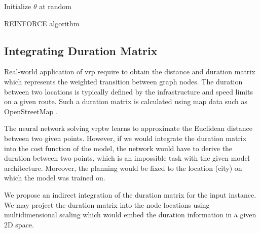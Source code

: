         \begin{algorithm}[H]
            
            Initialize $\theta$ at random\;
         \caption{REINFORCE algorithm}
        \end{algorithm}
        
    
    \subsection{Integrating Duration Matrix}
    Real-world application of \gls{vrp} require to obtain the distance and duration matrix which represents the weighted transition between graph nodes. The duration between two locations is typically defined by the infrastructure and speed limits on a given route. Such a duration matrix is calculated using map data such as OpenStreetMap \cite{osm}.
    
    The neural network solving \gls{vrptw} learns to approximate the Euclidean distance between two given points. However, if we would integrate the duration matrix into the cost function of the model, the network would have to derive the duration between two points, which is an impossible task with the given model architecture. Moreover, the planning would be fixed to the location (city) on which the model was trained on.
    
    We propose an indirect integration of the duration matrix for the input instance. We may project the duration matrix into the node locations using multidimensional scaling \cite{mds} which would embed the duration information in a given 2D space.
